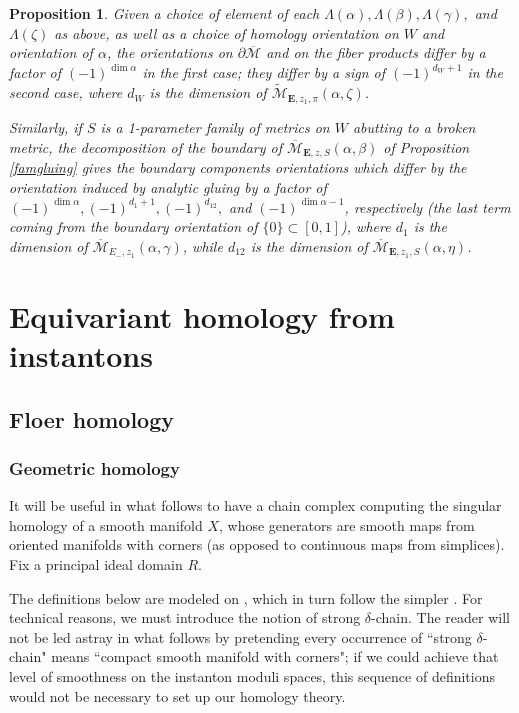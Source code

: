 \documentclass{memo-l}
\newtheorem{proposition}[theorem]{Proposition}
\theoremstyle{definition}
\theoremstyle{remark}
\numberwithin{section}{chapter}
\numberwithin{equation}{chapter}
\begin{document}
\begin{proposition}
Given a choice of element of each $\Lambda(\alpha), \Lambda(\beta), \Lambda(\gamma),$ and $\Lambda(\zeta)$ as above, as well as a choice of homology orientation on $W$ and orientation of $\alpha$, the orientations on $\partial \overline{\mathcal M}$ and on the fiber products differ by a factor of $(-1)^{\dim \alpha}$ in the first case; they differ by a sign of $(-1)^{d_W+1}$ in the second case, where $d_W$ is the dimension of $\widetilde{\mathcal M}_{\mathbf{E},z_1,\pi}(\alpha, \zeta)$.

Similarly, if $S$ is a 1-parameter family of metrics on $W$ abutting to a broken metric, the decomposition of the boundary of $\overline{\mathcal M}_{\mathbf{E},z,S}(\alpha, \beta)$ of Proposition \ref{famgluing} gives the boundary components orientations which differ by the orientation induced by analytic gluing by a factor of $(-1)^{\dim \alpha}, (-1)^{d_1+1}, (-1)^{d_{12}}, $ and $(-1)^{\dim \alpha - 1}$, respectively (the last term coming from the boundary orientation of $\{0\} \subset [0,1]$), where $d_1$ is the dimension of $\overline{\mathcal M}_{E_-, z_1}(\alpha, \gamma)$, while $d_{12}$ is the dimension of $\overline{\mathcal M}_{\mathbf{E},z_1,S}(\alpha, \eta)$. 
\end{proposition}

\part{Equivariant homology from instantons}\label{part2}


\chapter{Floer homology}\label{chap:6}
\section{Geometric homology}\label{sec:Floer-gchain}
It will be useful in what follows to have a chain complex computing the singular homology of a smooth manifold $X$, whose generators are smooth maps from oriented manifolds with corners (as opposed to continuous maps from simplices). Fix a principal ideal domain $R$. 

The definitions below are modeled on \cite[Chapter~4.1]{Lin}, which in turn follow the simpler \cite{Lip}. For technical reasons, we must introduce the notion of strong $\delta$-chain. The reader will not be led astray in what follows by pretending every occurrence of ``strong $\delta$-chain" means ``compact smooth manifold with corners"; if we could achieve that level of smoothness on the instanton moduli spaces, this sequence of definitions would not be necessary to set up our homology theory. 
\end{document}
